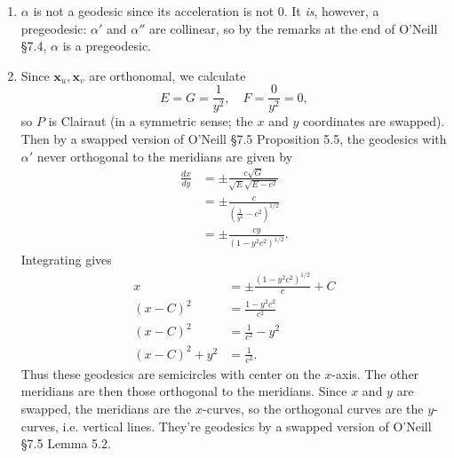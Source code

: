 \documentclass[twoside,10pt]{report}
\begin{document}
\begin{enumerate}
	\item $\alpha$ is not a geodesic since its acceleration is not 0. It \textit{is}, however, a pregeodesic: $\alpha'$ and $\alpha''$ are collinear, so by the remarks at the end of O'Neill \S 7.4, $\alpha$ is a pregeodesic.

	\item Since $\mathbf{x}_{u}, \mathbf{x}_{v}$ are orthonomal, we calculate
		\[
		E=G=\frac{1}{y^{2}} , \quad F = \frac{0}{y^{2}} =0,
	\] so $P$ is Clairaut (in a symmetric sense; the $x$ and $y$ coordinates are swapped). Then by a swapped version of O'Neill \S 7.5 Proposition 5.5, the geodesics with $\alpha'$ never orthogonal to the meridians are given by
	\begin{align*}
		\frac{d x}{d y} &= \pm \frac{c\sqrt{G} }{\sqrt{E} \sqrt{E-c^2} } \\
				&= \pm \frac{c}{\left( \frac{1}{y^2} -c^2 \right)^{1/2}} \\
				&= \pm \frac{cy}{(1-y^2c^2)^{1/2}} .
	\end{align*}
	Integrating gives
	\begin{align*}
		x &= \pm \frac{(1-y^{2}c^{2})^{1/2}}{c}+C\\
		(x-C)^2&= \frac{1-y^2c^2}{c^2} \\
		(x-C)^2&=\frac{1}{c^2} -y^2\\
		(x-C)^2+y^2&=\frac{1}{c^2} .
	\end{align*}
	Thus these geodesics are semicircles with center on the $x$-axis. The other meridians are then those orthogonal to the meridians. Since $x$ and $y$ are swapped, the meridians are the $x$-curves, so the orthogonal curves are the $y$-curves, i.e. vertical lines. They're geodesics by a swapped version of O'Neill \S 7.5 Lemma 5.2.
\end{enumerate}
\end{document}
